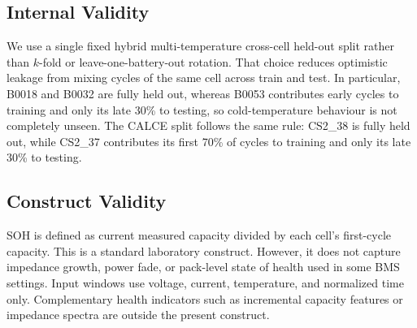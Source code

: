 \documentclass[a4paper,fleqn]{cas-sc}
\begin{document}
\subsection{Internal Validity}\label{sec:internal}
We use a single fixed hybrid multi-temperature cross-cell held-out split rather than $k$-fold or leave-one-battery-out rotation. That choice reduces optimistic leakage from mixing cycles of the same cell across train and test.
In particular, B0018 and B0032 are fully held out, whereas B0053 contributes early cycles to training and only its late 30\% to testing, so cold-temperature behaviour is not completely unseen. The CALCE split follows the same rule: CS2\_38 is fully held out, while CS2\_37 contributes its first 70\% of cycles to training and only its late 30\% to testing.

\subsection{Construct Validity}\label{sec:construct}
SOH is defined as current measured capacity divided by each cell's first-cycle capacity. This is a standard laboratory construct. However, it does not capture impedance growth, power fade, or pack-level state of health used in some BMS settings. 
Input windows use voltage, current, temperature, and normalized time only. Complementary health indicators such as incremental capacity features or impedance spectra are outside the present construct. 

\end{document}
